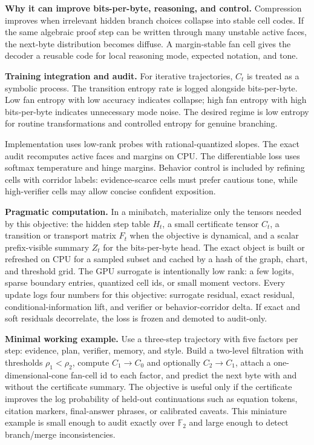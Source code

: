 \documentclass[10pt]{article}
\newcommand{\FF}{\mathbb{F}}
\numberwithin{equation}{section}
\begin{document}
\noindent\textbf{Why it can improve bits-per-byte, reasoning, and control.} Compression improves when irrelevant hidden branch choices collapse into stable cell codes. If the same algebraic proof step can be written through many unstable active faces, the next-byte distribution becomes diffuse. A margin-stable fan cell gives the decoder a reusable code for local reasoning mode, expected notation, and tone.

\noindent\textbf{Training integration and audit.} For iterative trajectories, $C_t$ is treated as a symbolic process. The transition entropy rate is logged alongside bits-per-byte. Low fan entropy with low accuracy indicates collapse; high fan entropy with high bits-per-byte indicates unnecessary mode noise. The desired regime is low entropy for routine transformations and controlled entropy for genuine branching.

Implementation uses low-rank probes with rational-quantized slopes. The exact audit recomputes active faces and margins on CPU. The differentiable loss uses softmax temperature and hinge margins. Behavior control is included by refining cells with corridor labels: evidence-scarce cells must prefer cautious tone, while high-verifier cells may allow concise confident exposition.

\noindent\textbf{Pragmatic computation.} In a minibatch, materialize only the tensors needed by this objective: the hidden step table $H_t$, a small certificate tensor $C_t$, a transition or transport matrix $F_t$ when the objective is dynamical, and a scalar prefix-visible summary $Z_t$ for the bits-per-byte head. The exact object is built or refreshed on CPU for a sampled subset and cached by a hash of the graph, chart, and threshold grid. The GPU surrogate is intentionally low rank: a few logits, sparse boundary entries, quantized cell ids, or small moment vectors. Every update logs four numbers for this objective: surrogate residual, exact residual, conditional-information lift, and verifier or behavior-corridor delta. If exact and soft residuals decorrelate, the loss is frozen and demoted to audit-only.

\noindent\textbf{Minimal working example.} Use a three-step trajectory with five factors per step: evidence, plan, verifier, memory, and style. Build a two-level filtration with thresholds $\rho_1<\rho_2$, compute $C_1\to C_0$ and optionally $C_2\to C_1$, attach a one-dimensional-cone fan-cell id to each factor, and predict the next byte with and without the certificate summary. The objective is useful only if the certificate improves the log probability of held-out continuations such as equation tokens, citation markers, final-answer phrases, or calibrated caveats. This miniature example is small enough to audit exactly over $\FF_2$ and large enough to detect branch/merge inconsistencies.
\end{document}
